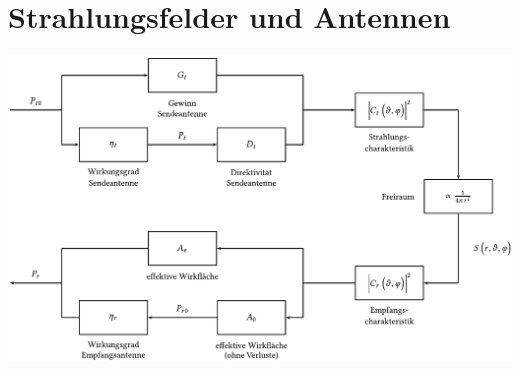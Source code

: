 \vspace{1cm}
\section{Strahlungsfelder und Antennen}
\includegraphics[width=.4\paperheight]{content/fuw/pictures/fuw_antenne.png}

